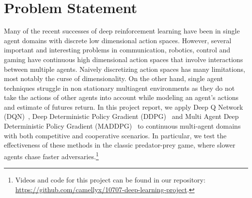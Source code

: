 
\section{Problem Statement}
\label{sec:problem}

Many of the recent successes of deep reinforcement learning have been in single agent domains with discrete low dimensional action spaces. However, several important and interesting problems in communication, robotics, control and gaming have continuous high dimensional action spaces that involve interactions between multiple agents. Naively discretizing action spaces has many limitations, most notably the curse of dimensionality. On the other hand, single agent techniques struggle in non stationary multiagent environments as they do not take the actions of other agents into account while modeling an agent's actions and estimate of futures return. In this project report, we apply Deep Q Network (DQN)~\cite{mnih2016dqn}, Deep Deterministic Policy Gradient (DDPG)~\cite{lillicrap2016continuous} and Multi Agent Deep Deterministic Policy Gradient (MADDPG)~\cite{lowe2017multi} to continuous multi-agent domains with both competitive and cooperative scenarios. In particular, we test the effectiveness of these methods in the classic predator-prey game, where slower agents chase faster adversaries.\footnote{Videos and code for this project can be found in our repository: \url{https://github.com/camellyx/10707-deep-learning-project}.}
 
